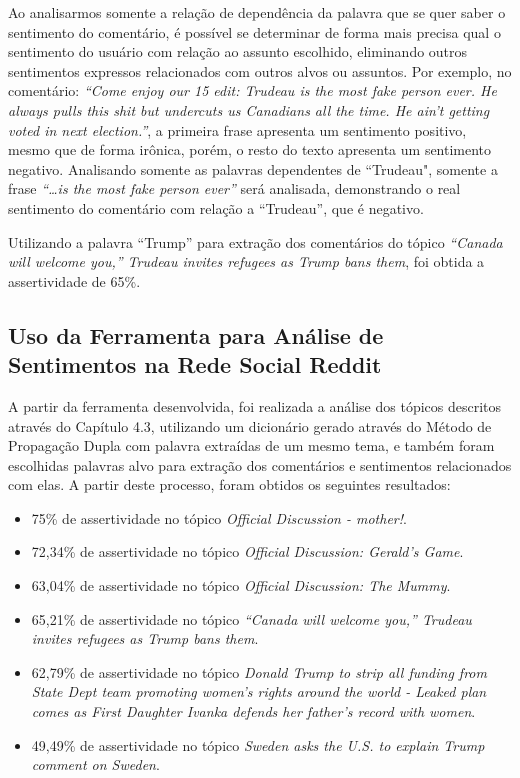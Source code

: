 Ao analisarmos somente a relação de dependência da palavra que se quer saber o
sentimento do comentário, é possível se determinar de forma mais precisa qual o
sentimento do usuário com relação ao assunto escolhido, eliminando outros
sentimentos expressos relacionados com outros alvos ou assuntos. Por exemplo,
no comentário: \textit{``Come enjoy our 15%
edit: Trudeau is the most fake person ever. He always pulls this shit but
undercuts us Canadians all the time. He ain't getting voted in next
election.''}, a primeira frase apresenta um sentimento positivo, mesmo que de
forma irônica, porém, o resto do texto apresenta um sentimento negativo.
Analisando somente as palavras dependentes de ``Trudeau", somente a frase
\textit{``\ldots is the most fake person ever''} será analisada, demonstrando o
real sentimento do comentário com relação a ``Trudeau'', que é negativo.

Utilizando a palavra ``Trump'' para extração dos comentários do tópico \textit{``Canada will welcome
you,” Trudeau invites refugees as Trump bans them}, foi obtida a assertividade
de 65\%.


\subsection{Uso da Ferramenta para Análise de
Sentimentos na Rede Social Reddit}

A partir da ferramenta desenvolvida, foi realizada a análise dos tópicos
descritos através do Capítulo 4.3, utilizando um dicionário gerado através do
Método de Propagação Dupla com palavra extraídas de um mesmo tema, e também
foram escolhidas palavras alvo para extração dos comentários e sentimentos
relacionados com elas. A partir deste processo, foram obtidos os seguintes
resultados:

\begin{itemize}
  \item 75\% de assertividade no tópico \textit{Official Discussion - mother!}.
  \item 72,34\% de assertividade no tópico \textit{Official Discussion: Gerald's
  Game}.
  \item 63,04\% de assertividade no tópico \textit{Official Discussion: The
  Mummy}.
  \item 65,21\% de assertividade no tópico \textit{“Canada will welcome you,”
  Trudeau invites refugees as Trump bans them}.
  \item 62,79\% de assertividade no tópico \textit{Donald Trump to strip all
  funding from State Dept team promoting women's rights around the world - Leaked plan comes as First Daughter Ivanka defends her father's record with women}.
  \item 49,49\% de assertividade no tópico \textit{Sweden asks the U.S. to
  explain Trump comment on Sweden}.
\end{itemize}


